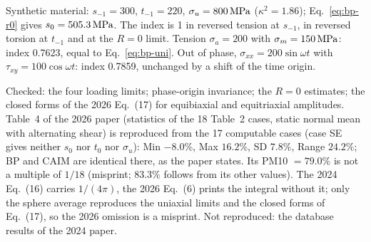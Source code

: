  Synthetic material: $s_{-1}=300$, $t_{-1}=220$, $\sigma_u=800\,\mathrm{MPa}$
($\kappa^2=1.86$); Eq.~\eqref{eq:bp-r0} gives $s_0=505.3\,\mathrm{MPa}$. The index is 1 in reversed tension at
$s_{-1}$, in reversed torsion at $t_{-1}$ and at the $R=0$ limit. Tension $\sigma_a=200$ with
$\sigma_m=150\,\mathrm{MPa}$: index 0.7623, equal to Eq.~\eqref{eq:bp-uni}. Out of phase, $\sigma_{xx}=200\sin\omega t$
with $\tau_{xy}=100\cos\omega t$: index 0.7859, unchanged by a shift of the time origin.

 Checked: the four loading limits; phase-origin invariance; the $R=0$ estimates;
the closed forms of the 2026 Eq.~(17) for equibiaxial and equitriaxial amplitudes. Table~4 of the
2026 paper (statistics of the 18 Table~2 cases, static normal mean with alternating shear) is
reproduced from the 17 computable cases (case SE gives neither $s_0$ nor $t_0$ nor $\sigma_u$): Min
$-8.0\%$, Max $16.2\%$, SD $7.8\%$, Range $24.2\%$; BP and CAIM are identical there, as the paper
states. Its PM10 $=79.0\%$ is not a multiple of $1/18$ (misprint; $83.3\%$ follows from its other
values). The 2024 Eq.~(16) carries $1/(4\pi)$, the 2026 Eq.~(6) prints the integral without it;
only the sphere average reproduces the uniaxial limits and the closed forms of Eq.~(17), so the 2026
omission is a misprint. Not reproduced: the database results of the 2024 paper.
